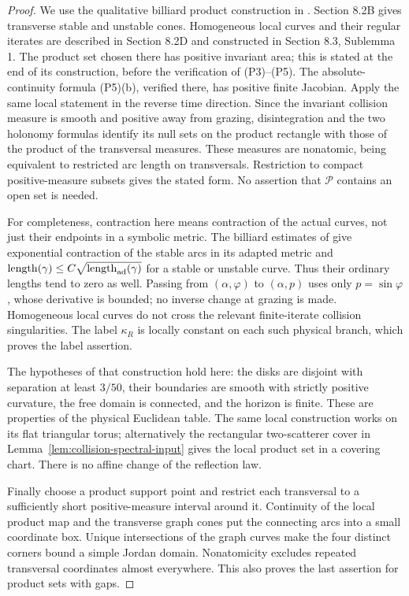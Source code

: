 \begin{proof}
We use the qualitative billiard product construction in
\cite[Sections 8.2--8.3]{Young}. Section 8.2B gives transverse stable
and unstable cones. Homogeneous local curves and their regular iterates
are described in Section 8.2D and constructed in Section 8.3,
Sublemma 1. The product set chosen there has positive invariant area;
this is stated at the end of its construction, before the verification
of (P3)--(P5). The absolute-continuity formula (P5)(b), verified there,
has positive finite Jacobian. Apply the same local statement in the
reverse time direction. Since the invariant collision measure is
smooth and positive away from grazing, disintegration and the two
holonomy formulas identify its null sets on the product rectangle with
those of the product of the transversal measures. These measures are
nonatomic, being equivalent to restricted arc length on transversals.
Restriction to compact positive-measure subsets gives the stated form.
No assertion that $\mathcal P$ contains an open set is needed.

For completeness, contraction here means contraction of the actual
curves, not just their endpoints in a symbolic metric. The billiard
estimates of \cite[Section 8.2C]{Young} give exponential contraction of
the stable arcs in its adapted metric and
$\operatorname{length}(\gamma)\le C\sqrt{\operatorname{length}_{\rm ad}(\gamma)}$
for a stable or unstable curve. Thus their ordinary lengths tend to
zero as well. Passing from $(\alpha,\varphi)$ to $(\alpha,p)$ uses only
$p=\sin\varphi$, whose derivative is bounded; no inverse change at
grazing is made. Homogeneous local curves do not cross the relevant
finite-iterate collision singularities. The label $\kappa_R$ is
locally constant on each such physical branch, which proves the label
assertion.

The hypotheses of that construction hold here: the disks are disjoint
with separation at least $3/50$, their boundaries are smooth with
strictly positive curvature, the free domain is connected, and the
horizon is finite. These are properties of the physical Euclidean
table. The same local construction works on its flat triangular torus;
alternatively the rectangular two-scatterer cover in
Lemma~\ref{lem:collision-spectral-input} gives the local product set in
a covering chart. There is no affine change of the reflection law.

Finally choose a product support point and restrict each transversal
to a sufficiently short positive-measure interval around it. Continuity
of the local product map and the transverse graph cones put the
connecting arcs into a small coordinate box. Unique intersections of
the graph curves make the four distinct corners bound a simple Jordan
domain. Nonatomicity excludes repeated transversal coordinates almost
everywhere. This also proves the last assertion for product sets with
gaps.
\end{proof}

